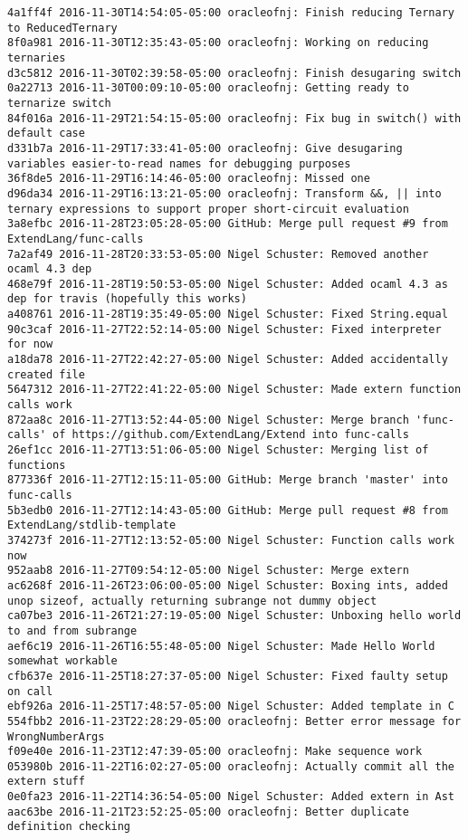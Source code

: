 \begin{lstlisting}
4a1ff4f 2016-11-30T14:54:05-05:00 oracleofnj: Finish reducing Ternary to ReducedTernary
8f0a981 2016-11-30T12:35:43-05:00 oracleofnj: Working on reducing ternaries
d3c5812 2016-11-30T02:39:58-05:00 oracleofnj: Finish desugaring switch
0a22713 2016-11-30T00:09:10-05:00 oracleofnj: Getting ready to ternarize switch
84f016a 2016-11-29T21:54:15-05:00 oracleofnj: Fix bug in switch() with default case
d331b7a 2016-11-29T17:33:41-05:00 oracleofnj: Give desugaring variables easier-to-read names for debugging purposes
36f8de5 2016-11-29T16:14:46-05:00 oracleofnj: Missed one
d96da34 2016-11-29T16:13:21-05:00 oracleofnj: Transform &&, || into ternary expressions to support proper short-circuit evaluation
3a8efbc 2016-11-28T23:05:28-05:00 GitHub: Merge pull request #9 from ExtendLang/func-calls
7a2af49 2016-11-28T20:33:53-05:00 Nigel Schuster: Removed another ocaml 4.3 dep
468e79f 2016-11-28T19:50:53-05:00 Nigel Schuster: Added ocaml 4.3 as dep for travis (hopefully this works)
a408761 2016-11-28T19:35:49-05:00 Nigel Schuster: Fixed String.equal
90c3caf 2016-11-27T22:52:14-05:00 Nigel Schuster: Fixed interpreter for now
a18da78 2016-11-27T22:42:27-05:00 Nigel Schuster: Added accidentally created file
5647312 2016-11-27T22:41:22-05:00 Nigel Schuster: Made extern function calls work
872aa8c 2016-11-27T13:52:44-05:00 Nigel Schuster: Merge branch 'func-calls' of https://github.com/ExtendLang/Extend into func-calls
26ef1cc 2016-11-27T13:51:06-05:00 Nigel Schuster: Merging list of functions
877336f 2016-11-27T12:15:11-05:00 GitHub: Merge branch 'master' into func-calls
5b3edb0 2016-11-27T12:14:43-05:00 GitHub: Merge pull request #8 from ExtendLang/stdlib-template
374273f 2016-11-27T12:13:52-05:00 Nigel Schuster: Function calls work now
952aab8 2016-11-27T09:54:12-05:00 Nigel Schuster: Merge extern
ac6268f 2016-11-26T23:06:00-05:00 Nigel Schuster: Boxing ints, added unop sizeof, actually returning subrange not dummy object
ca07be3 2016-11-26T21:27:19-05:00 Nigel Schuster: Unboxing hello world to and from subrange
aef6c19 2016-11-26T16:55:48-05:00 Nigel Schuster: Made Hello World somewhat workable
cfb637e 2016-11-25T18:27:37-05:00 Nigel Schuster: Fixed faulty setup on call
ebf926a 2016-11-25T17:48:57-05:00 Nigel Schuster: Added template in C
554fbb2 2016-11-23T22:28:29-05:00 oracleofnj: Better error message for WrongNumberArgs
f09e40e 2016-11-23T12:47:39-05:00 oracleofnj: Make sequence work
053980b 2016-11-22T16:02:27-05:00 oracleofnj: Actually commit all the extern stuff
0e0fa23 2016-11-22T14:36:54-05:00 Nigel Schuster: Added extern in Ast
aac63be 2016-11-21T23:52:25-05:00 oracleofnj: Better duplicate definition checking

\end{lstlisting}
